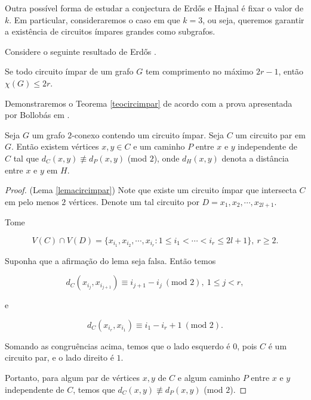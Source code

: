 Outra possível forma de estudar a conjectura de Erd\H{o}s e Hajnal é fixar o valor de $k$. Em particular, consideraremos o caso em que $k=3$, ou seja, queremos garantir a existência de circuitos ímpares grandes como subgrafos.

Considere o seguinte resultado de Erd\H{o}s \cite{erdHos1966chromatic}.

\begin{teorema}\label{teocircimpar}
Se todo circuito ímpar de um grafo $G$ tem comprimento no máximo $2r-1$, então $\chi(G) \leq 2r$.
\end{teorema}

Demonstraremos o Teorema \ref{teocircimpar} de acordo com a prova apresentada por Bollobás em \cite{bollobas2004extremal}.

\begin{lema}\label{lemacircimpar}
Seja $G$ um grafo $2$-conexo contendo um circuito ímpar. Seja $C$ um circuito par em $G$. Então existem vértices $x,y \in C$ e um caminho $P$ entre $x$ e $y$ independente de $C$ tal que $d_C(x,y) \not\equiv d_P(x,y)$ (mod $2$), onde $d_H(x,y)$ denota a distância entre $x$ e $y$ em $H$.
\end{lema}

\begin{proof}(Lema \ref{lemacircimpar})
Note que existe um circuito ímpar que intersecta $C$ em pelo menos $2$ vértices. Denote um tal circuito por $D = x_1, x_2, \cdots, x_{2l+1}$.

Tome

\[V(C) \cap V(D) = \{x_{i_1}, x_{i_2}, \cdots, x_{i_r} : 1\leq i_1 < \cdots < i_r \leq 2l+1 \},\ r\geq 2.\]

Suponha que a afirmação do lema seja falsa. Então temos

\[d_C(x_{i_j}, x_{i_{j+1}}) \equiv i_{j+1} - i_j\ (\text{mod } 2),\ 1\leq j< r,\]

e

\[d_C(x_{i_r}, x_{i_1}) \equiv i_1 - i_r + 1\ (\text{mod } 2).\]

Somando as congruências acima, temos que o lado esquerdo é $0$, pois $C$ é um circuito par, e o lado direito é $1$. 

Portanto, para algum par de vértices $x,y$ de $C$ e algum caminho $P$ entre $x$ e $y$ independente de $C$, temos que $d_C(x,y) \not\equiv d_P(x,y)$ (mod $2$).
\end{proof}

